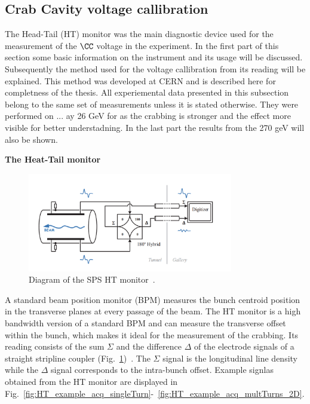 \subsection{Crab Cavity voltage callibration}
The Head-Tail (HT) monitor was the main diagnostic device used for the measurement of the $\CC$ voltage in the experiment. In the first part of this section some basic information on the instrument and its usage will be discussed. Subsequently the method used for the voltage callibration from its reading will be explained. This method was developed at CERN and is described here for completness of the thesis. All experiemental data presented in this subsection belong to the same set of measurements unless it is stated otherwise. They were performed on ... ay 26 GeV for as the crabbing is stronger and the effect more visible for better understadning. In the last part the results from the 270 geV will also be shown. 

\normalsize{\textbf{The Heat-Tail monitor}}\\
\begin{figure}[h]
   \centering         
   \includegraphics[width=0.8\textwidth]{images/Ch4/SPS_HT_monitor_diagram_modified.png}
       \caption{Diagram of the SPS HT monitor~\cite{Levens:2313358}.}
       \label{fig:SPS_HT_diagram}
\end{figure}
A standard beam position monitor (BPM) measures the bunch centroid position in the transverse planes at every passage of the beam. The HT monitor is a high bandwidth version of a standard BPM and can measure the transverse offset within the bunch, which makes it ideal for the measurement of the crabbing. Its reading consists of the sum $\Sigma$ and the  difference $\Delta$ of the electrode signals of a straight stripline coupler (Fig.~\ref{fig:SPS_HT_diagram})~\cite{Jones:987561, Levens:2313358}. The $\Sigma$ signal is the longitudinal line density while the $\Delta$ signal corresponds to the intra-bunch offset. Example signlas obtained from the HT monitor are displayed in Fig.~\ref{fig:HT_example_acq_singleTurn}-~\ref{fig:HT_example_acq_multTurns_2D}.


